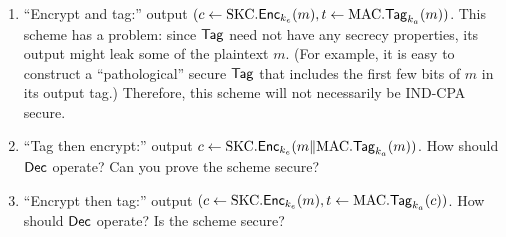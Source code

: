 \documentclass[11pt]{article}
\begin{document}
\begin{enumerate}
\item ``Encrypt and tag:'' output $(c \gets \text{SKC}.\mathsf{Enc}_{k_e}(m), t
  \gets \text{MAC}.\mathsf{Tag}_{k_a}(m))$.  This scheme has a problem: since
  $\mathsf{Tag}$ need not have any secrecy properties, its output might
  leak some of the plaintext $m$.  (For example, it is easy to
  construct a ``pathological'' secure $\mathsf{Tag}$ that includes the
  first few bits of $m$ in its output tag.)  Therefore, this scheme
  will not necessarily be IND-CPA secure.
  
\item ``Tag then encrypt:'' output $c \gets \text{SKC}.\mathsf{Enc}_{k_e}(m
  \| \text{MAC}.\mathsf{Tag}_{k_a}(m))$.  How should $\mathsf{Dec}$ operate?  Can
  you prove the scheme secure?
  
\item ``Encrypt then tag:'' output $(c \gets \text{SKC}.\mathsf{Enc}_{k_e}(m), t
  \gets \text{MAC}.\mathsf{Tag}_{k_a}(c))$.  How should $\mathsf{Dec}$ operate?  Is
  the scheme secure?
\end{enumerate}
\end{document}
